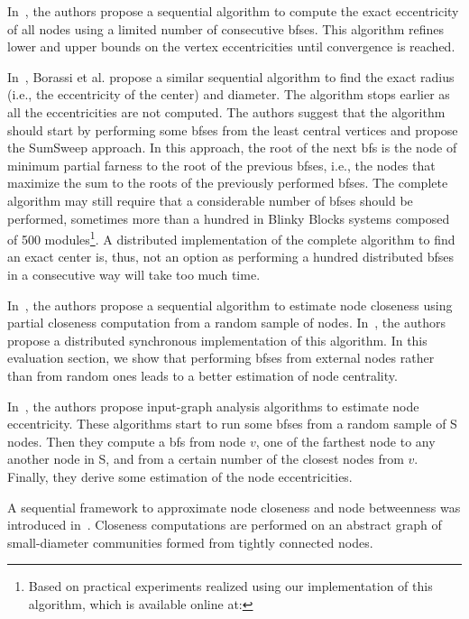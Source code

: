 
In~\cite{takes2013computing}, the authors propose a sequential algorithm to compute the exact eccentricity of all nodes using a limited number of consecutive \gls{bfses}. This algorithm refines lower and upper bounds on the vertex eccentricities until convergence is reached. 

In~\cite{borassi2014solvability}, Borassi et al. propose a similar sequential algorithm to find the exact radius (i.e., the eccentricity of the center) and diameter. The algorithm stops earlier as all the eccentricities are not computed. The authors suggest that the algorithm should start by performing some \gls{bfses} from the least central vertices and propose the SumSweep approach. In this approach, the root of the next \gls{bfs} is the node of minimum partial farness to the root of the previous \gls{bfses}, i.e., the nodes that maximize the sum to the roots of the previously performed \gls{bfses}. The complete algorithm may still require that a considerable number of \gls{bfses} should be performed, sometimes more than a hundred in Blinky Blocks systems composed of 500 modules\footnote{Based on practical experiments realized using our implementation of this algorithm, which is available online at: \GAURL{}}. A distributed implementation of the complete algorithm to find an exact center is, thus, not an option as performing a hundred distributed \gls{bfses} in a consecutive way will take too much time.

In~\cite{eppstein2001fast}, the authors propose a sequential algorithm to estimate node closeness using partial closeness computation from a random sample of nodes. In~\cite{dissler2016distributed}, the authors propose a distributed synchronous implementation of this algorithm. In this evaluation section, we show that performing \gls{bfses} from external nodes rather than from random ones leads to a better estimation of node centrality.

In~\cite{roditty2013fast,chechik2014better}, the authors propose input-graph analysis algorithms to estimate node eccentricity. These algorithms start to run some \gls{bfses} from a random sample of S nodes. Then they compute a \gls{bfs} from node $v$, one of the farthest node to any another node in S, and from a certain number of the closest nodes from $v$. Finally, they derive some estimation of the node eccentricities.

A sequential framework to approximate node closeness and node betweenness was introduced in~\cite{chan2009fast}. Closeness computations are performed on an abstract graph of small-diameter communities formed from tightly connected nodes.

